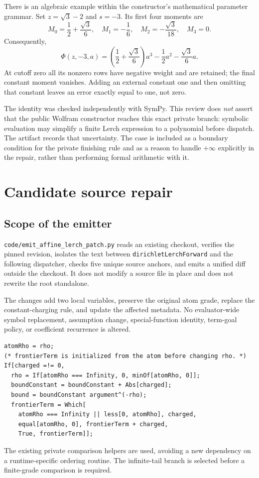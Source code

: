 \documentclass[11pt,letterpaper]{article}
\newcommand{\code}[1]{\nolinkurl{#1}}
\begin{document}
There is an algebraic example within the constructor's mathematical parameter
grammar. Set $z=\sqrt3-2$ and $s=-3$. Its first four moments are
\[
 M_0=\frac12+\frac{\sqrt3}{6},\quad
 M_1=-\frac16,\quad M_2=-\frac{\sqrt3}{18},\quad M_3=0.
\]
Consequently,
\begin{equation}
 \Phi(z,-3,a)=
 \left(\frac12+\frac{\sqrt3}{6}\right)a^3
 -\frac12a^2-\frac{\sqrt3}{6}a.
\end{equation}
At cutoff zero all its nonzero rows have negative weight and are retained;
the final constant moment vanishes. Adding an external constant one and then
omitting that constant leaves an error exactly equal to one, not zero.

The identity was checked independently with SymPy. This review does
\emph{not} assert that the public Wolfram constructor reaches this exact private
branch: symbolic evaluation may simplify a finite Lerch expression to a
polynomial before dispatch. The artifact records that uncertainty. The case
is included as a boundary condition for the private finishing rule and as a
reason to handle $+\infty$ explicitly in the repair, rather than performing
formal arithmetic with it.

\section{Candidate source repair}
\subsection{Scope of the emitter}
\code{code/emit_affine_lerch_patch.py} reads an existing checkout, verifies the
pinned revision, isolates the text between \code{dirichletLerchForward} and the
following dispatcher, checks five unique source anchors, and emits a unified
diff outside the checkout. It does not modify a source file in place and does
not rewrite the root standalone.

The changes add two local variables, preserve the original atom grade, replace
the constant-charging rule, and update the affected metadata. No evaluator-wide
symbol replacement, assumption change, special-function identity, term-goal
policy, or coefficient recurrence is altered.

\begin{lstlisting}
atomRho = rho;
(* frontierTerm is initialized from the atom before changing rho. *)
If[charged =!= 0,
  rho = If[atomRho === Infinity, 0, minOf[atomRho, 0]];
  boundConstant = boundConstant + Abs[charged];
  bound = boundConstant argument^(-rho);
  frontierTerm = Which[
    atomRho === Infinity || less[0, atomRho], charged,
    equal[atomRho, 0], frontierTerm + charged,
    True, frontierTerm]];
\end{lstlisting}
The existing private comparison helpers are used, avoiding a new dependency
on a runtime-specific ordering routine. The infinite-tail branch is selected
before a finite-grade comparison is required.
\end{document}
